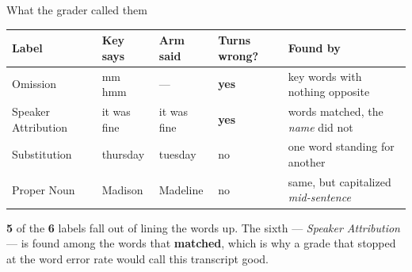 \documentclass[aspectratio=169]{beamer}
\newcommand{\keybox}[1]{%
  \par\vspace{4pt}\begingroup\centering
  \colorbox{warmbg}{\parbox{0.93\textwidth}{\centering #1}}%
  \par\endgroup\vspace{2pt}}
\newenvironment{nicetable}[1]
  {\par\vspace{2pt}\begingroup\centering\small
   \renewcommand{\arraystretch}{1.18}%
   \setlength{\tabcolsep}{6pt}\rowcolors{2}{band}{white}%
   \begin{tabular}{#1}\arrayrulecolor{hdr}\toprule}
  {\bottomrule\end{tabular}\par\endgroup\vspace{2pt}}
\newcommand{\hd}[1]{\textcolor{hdr}{\textbf{#1}}}
\newcommand{\num}[1]{\textcolor{warm}{\textbf{#1}}}
\begin{document}
\begin{frame}{What the grader called them}

\begin{nicetable}{p{2.5cm}p{1.8cm}p{1.8cm}p{1.2cm}p{4.1cm}}
\hd{Label} & \hd{Key says} & \hd{Arm said} & \hd{Turns wrong?} & \hd{Found by} \\
\midrule
Omission & \ttfamily mm hmm & \ttfamily --- & \textcolor{warm}{\textbf{yes}}
  & key words with nothing opposite \\
Speaker Attribution & \ttfamily it was fine & \ttfamily it was fine
  & \textcolor{warm}{\textbf{yes}}
  & words matched, the \emph{name} did not \\
Substitution & \ttfamily thursday & \ttfamily tuesday & no
  & one word standing for another \\
Proper Noun & \ttfamily Madison & \ttfamily Madeline & no
  & same, but capitalized \emph{mid-sentence} \\
\end{nicetable}

\keybox{\num{5} of the \num{6} labels fall out of lining the words up. The sixth ---
\emph{Speaker Attribution} --- is found among the words that \textbf{matched}, which is why
a grade that stopped at the word error rate would call this transcript good.}

\end{frame}
\end{document}
